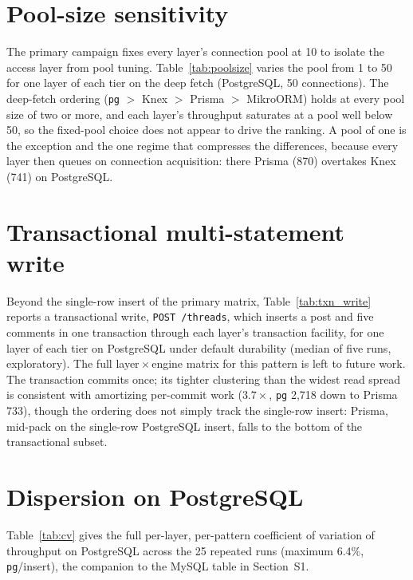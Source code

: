 \documentclass[11pt,a4paper]{article}
\newcommand{\tabledir}{tables/}
\begin{document}


\section{Pool-size sensitivity}
\label{sup:poolsize}
The primary campaign fixes every layer's connection pool at 10 to isolate the
access layer from pool tuning. Table~\ref{tab:poolsize} varies the pool from 1 to
50 for one layer of each tier on the deep fetch (PostgreSQL, 50
connections). The deep-fetch ordering (\texttt{pg} $>$ Knex $>$ Prisma $>$ MikroORM) holds at every pool size of
two or more, and each layer's throughput saturates at a pool well below 50, so the fixed-pool choice
does not appear to drive the ranking. A pool of one is the exception and the one regime that
compresses the differences, because every layer then queues on connection acquisition: there
Prisma (870) overtakes Knex (741) on PostgreSQL.



\section{Transactional multi-statement write}
\label{sup:txn}
Beyond the single-row insert of the primary matrix, Table~\ref{tab:txn_write}
reports a transactional write, \texttt{POST /threads}, which inserts a post and
five comments in one transaction through each layer's transaction facility, for
one layer of each tier on PostgreSQL under default durability (median of five
runs, exploratory). The
full layer\,$\times$\,engine matrix for this pattern is left to future work. The
transaction commits once; its tighter clustering than the widest read spread
is consistent with amortizing per-commit work ($3.7\times$, \texttt{pg} 2{,}718 down to
Prisma 733), though the ordering does not simply track the single-row insert:
Prisma, mid-pack on the single-row PostgreSQL insert, falls to the bottom of the
transactional subset.



\section{Dispersion on PostgreSQL}
\label{sup:cv-pg}
Table~\ref{tab:cv} gives the full per-layer, per-pattern coefficient of variation
of throughput on PostgreSQL across the 25 repeated runs (maximum 6.4\%,
\texttt{pg}/insert), the companion to the MySQL table in Section~S1.
\end{document}
